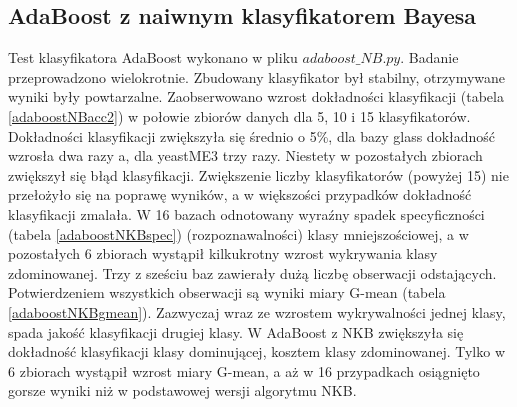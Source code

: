 \subsection{AdaBoost z naiwnym klasyfikatorem Bayesa}
Test klasyfikatora AdaBoost wykonano w pliku $adaboost\_NB.py$. Badanie przeprowadzono wielokrotnie. Zbudowany klasyfikator był stabilny, otrzymywane wyniki były powtarzalne. Zaobserwowano wzrost dokładności klasyfikacji (tabela \ref{adaboostNBacc2}) w połowie zbiorów danych dla 5, 10 i 15 klasyfikatorów. Dokładności klasyfikacji zwiększyła się średnio o 5\%, dla bazy glass dokładność wzrosła dwa razy a, dla yeastME3 trzy razy. Niestety w pozostałych zbiorach zwiększył się błąd klasyfikacji. Zwiększenie liczby klasyfikatorów (powyżej 15) nie przełożyło się na poprawę wyników, a w większości przypadków dokładność klasyfikacji zmalała. W 16 bazach odnotowany wyraźny spadek specyficzności (tabela \ref{adaboostNKBspec}) (rozpoznawalności) klasy mniejszościowej, a w pozostałych 6 zbiorach wystąpił kilkukrotny wzrost wykrywania klasy zdominowanej. Trzy z sześciu baz zawierały dużą liczbę obserwacji odstających. Potwierdzeniem wszystkich obserwacji są wyniki miary G-mean (tabela \ref{adaboostNKBgmean}). Zazwyczaj wraz ze wzrostem wykrywalności jednej klasy, spada jakość klasyfikacji drugiej klasy. W AdaBoost z NKB zwiększyła się dokładność klasyfikacji klasy dominującej, kosztem klasy zdominowanej. Tylko w 6 zbiorach wystąpił wzrost miary G-mean, a aż w 16 przypadkach osiągnięto gorsze wyniki niż w podstawowej wersji algorytmu NKB.
